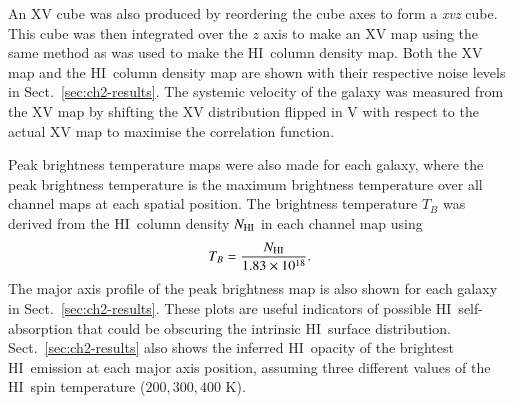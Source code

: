 \documentclass[traditabstract]{aa} %
\newcommand\HI{H{\small I}}
\begin{document}
An XV cube was also produced by reordering the cube axes to form a
{\em xvz} cube. This cube was then integrated over the $z$ axis to
make an XV map using the same method as was used to make the \HI\
column density map. Both the XV map and the \HI\ column density map
are shown with their respective noise levels in
Sect.~\ref{sec:ch2-results}.  The systemic velocity of the galaxy
was measured from the XV map by shifting the XV distribution flipped
in V with respect to the actual XV map to maximise the correlation
function.

Peak brightness temperature maps were also made for each galaxy,
where the peak brightness temperature is the maximum brightness
temperature over all channel maps at each spatial position. The
brightness temperature $T_B$ was derived from the \HI\ column density
$N_{\rm HI}$ in each channel map using \begin{equation} T_B =
\frac{N_{\rm HI}}{1.83\times 10^{18}}.  \end{equation} The major
axis profile of the peak brightness map is also shown for each
galaxy in Sect.~\ref{sec:ch2-results}. These plots are useful
indicators of possible \HI\ self-absorption that could be obscuring
the intrinsic \HI\ surface distribution. Sect.~\ref{sec:ch2-results}
also shows the inferred \HI\ opacity of the brightest \HI\ emission
at each major axis position, assuming three different values of the
\HI\ spin temperature ($200, 300, 400$ K).
\end{document}
